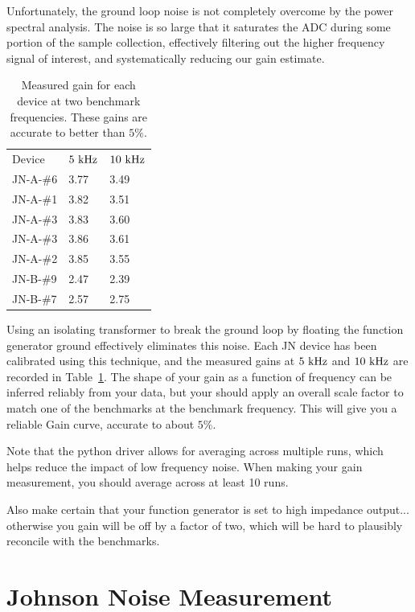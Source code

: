 \documentclass[12pt]{article}
\begin{document}
Unfortunately, the ground loop noise is not completely overcome by the power spectral analysis.   The noise is so large that it saturates the ADC during some portion of the sample collection, effectively filtering out the higher frequency signal of interest, and systematically reducing our gain estimate.

\begin{table}[htbp]
\begin{center}
\begin{tabular}{lll}
Device & $5~\rm kHz$ & $10~\rm kHz$ \\ 
JN-A-\#6 & 3.77 & 3.49 \\
JN-A-\#1 & 3.82 & 3.51 \\
JN-A-\#3 & 3.83 & 3.60 \\
JN-A-\#3 & 3.86 & 3.61 \\
JN-A-\#2 & 3.85 & 3.55 \\
JN-B-\#9 & 2.47 & 2.39 \\
JN-B-\#7 & 2.57 & 2.75 \\
\end{tabular}
\end{center}
\caption{\label{tbl:gain} Measured gain for each device at two benchmark frequencies.   These gains are accurate to better than $5\%$.}
\end{table}

Using an isolating transformer to break the ground loop by floating the function generator ground effectively eliminates this noise.  Each JN device has been calibrated using this technique, and the measured gains at $5~\rm kHz$ and $10~\rm kHz$ are recorded in Table~\ref{tbl:gain}.  The shape of your gain as a function of frequency can be inferred reliably from your data, but your should apply an overall scale factor to match one of the benchmarks at the benchmark frequency.  This will give you a reliable Gain curve, accurate to about $5\%$.

Note that the python driver allows for averaging across multiple runs, which helps reduce the impact of low frequency noise.  When making your gain measurement, you should average across at least 10 runs.

Also make certain that your function generator is set to high impedance output... otherwise you gain will be off by a factor of two, which will be hard to plausibly reconcile with the benchmarks.

\section{Johnson Noise Measurement}
\end{document}
